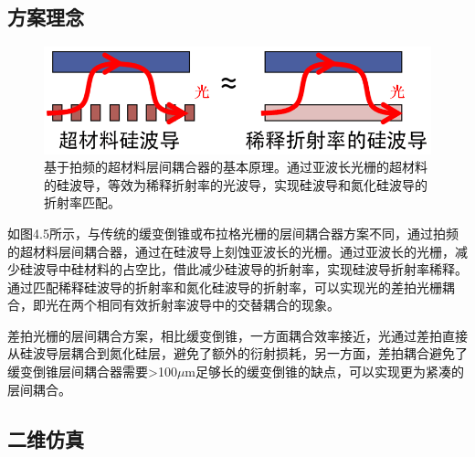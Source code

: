 \subsection{方案理念}

\begin{figure}[!htbp]
    \centering
    \includegraphics[width=1\textwidth]{Img/4-5.png}
    \caption{基于拍频的超材料层间耦合器的基本原理。通过亚波长光栅的超材料的硅波导，等效为稀释折射率的光波导，实现硅波导和氮化硅波导的折射率匹配。}
    \label{fig:4-5}
\end{figure}
如图4.5所示，与传统的缓变倒锥或布拉格光栅的层间耦合器方案不同，通过拍频的超材料层间耦合器，通过在硅波导上刻蚀亚波长的光栅。通过亚波长的光栅，减少硅波导中硅材料的占空比，借此减少硅波导的折射率，实现硅波导折射率稀释。通过匹配稀释硅波导的折射率和氮化硅波导的折射率，可以实现光的差拍光栅耦合，即光在两个相同有效折射率波导中的交替耦合的现象。

差拍光栅的层间耦合方案，相比缓变倒锥，一方面耦合效率接近，光通过差拍直接从硅波导层耦合到氮化硅层，避免了额外的衍射损耗，另一方面，差拍耦合避免了缓变倒锥层间耦合器需要>100$\mu$m足够长的缓变倒锥的缺点，可以实现更为紧凑的层间耦合。

\subsection{二维仿真}

